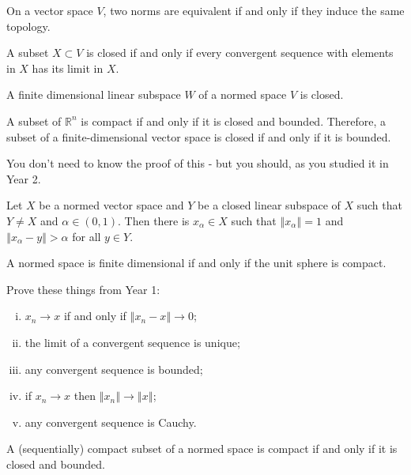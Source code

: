 \documentclass[a4paper]{article}
\newcommand{\R}{\mathbb{R}}
\newcommand{\norm}[1]{\left\Vert #1 \right\Vert}
\newcommand{\<}{\langle}
\renewcommand{\>}{\rangle}
\renewcommand{\a}{\alpha}
\begin{document}
\begin{prop}
  On a vector space $V$, two norms are equivalent if and only if they induce the same topology.
\end{prop}

\begin{lemma}
  A subset $X\subset V$ is closed if and only if every convergent sequence with elements in $X$ has its limit in $X$.
\end{lemma}

\begin{prop}
  A finite dimensional linear subspace $W$ of a normed space $V$ is closed.
\end{prop}

\begin{thm}
  A subset of $\R^n$ is compact if and only if it is closed and bounded. Therefore, a subset of a finite-dimensional vector space is closed if and only if it is bounded.
\end{thm}

You don't need to know the proof of this - but you should, as you studied it in Year 2.

\begin{lemma}
  Let $X$ be a normed vector space and $Y$ be a closed linear subspace of $X$ such that $Y\neq X$ and $\a\in(0,1)$. Then there is $x_\a\in X$ such that $\norm{x_\a}=1$ and $\norm{x_\a-y}>\a$ for all $y\in Y$.
\end{lemma}

\begin{thm}
  A normed space is finite dimensional if and only if the unit sphere is compact.
\end{thm}

\begin{ex} Prove these things from Year 1:
  \begin{enumerate}[(i)]
    \item $x_n\to x$ if and only if $\norm{x_n-x}\to0$;
    \item the limit of a convergent sequence is unique;
    \item any convergent sequence is bounded;
    \item if $x_n\to x$ then $\norm{x_n}\to\norm{x}$;
    \item any convergent sequence is Cauchy.
  \end{enumerate}
\end{ex}

\begin{ex}
  A (sequentially) compact subset of a normed space is compact if and only if it is closed and bounded.
\end{ex}
\end{document}
